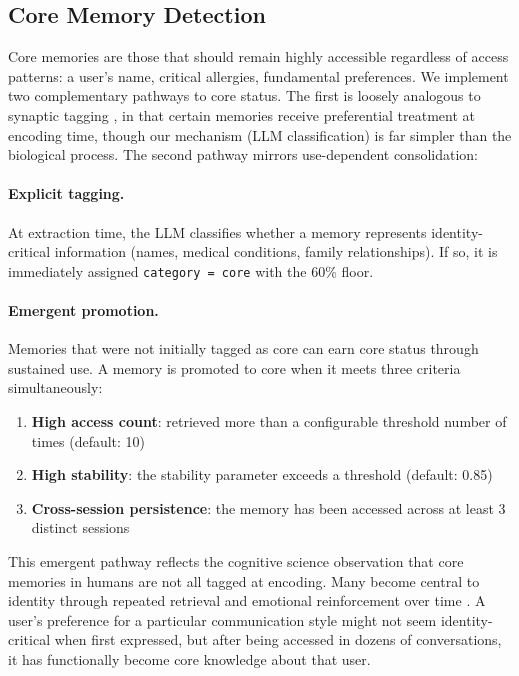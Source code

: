 \documentclass[11pt,a4paper]{article}
\begin{document}
\subsection{Core Memory Detection}
\label{sec:core}

Core memories are those that should remain highly accessible regardless of access patterns: a user's name, critical allergies, fundamental preferences. We implement two complementary pathways to core status. The first is loosely analogous to synaptic tagging \citep{frey1997synaptic}, in that certain memories receive preferential treatment at encoding time, though our mechanism (LLM classification) is far simpler than the biological process. The second pathway mirrors use-dependent consolidation:

\paragraph{Explicit tagging.} At extraction time, the LLM classifies whether a memory represents identity-critical information (names, medical conditions, family relationships). If so, it is immediately assigned \texttt{category = core} with the 60\% floor.

\paragraph{Emergent promotion.} Memories that were not initially tagged as core can earn core status through sustained use. A memory is promoted to core when it meets three criteria simultaneously:

\begin{enumerate}
    \item \textbf{High access count}: retrieved more than a configurable threshold number of times (default: 10)
    \item \textbf{High stability}: the stability parameter exceeds a threshold (default: 0.85)
    \item \textbf{Cross-session persistence}: the memory has been accessed across at least 3 distinct sessions
\end{enumerate}

This emergent pathway reflects the cognitive science observation that core memories in humans are not all tagged at encoding. Many become central to identity through repeated retrieval and emotional reinforcement over time \citep{bjork1992new}. A user's preference for a particular communication style might not seem identity-critical when first expressed, but after being accessed in dozens of conversations, it has functionally become core knowledge about that user.
\end{document}
